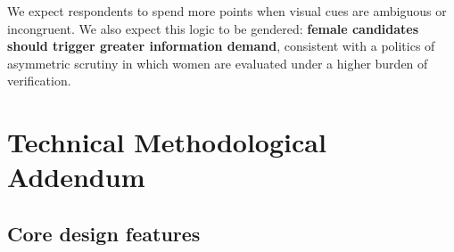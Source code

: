 \documentclass[11pt]{article}
\begin{document}
We expect respondents to spend more points when visual cues are ambiguous or incongruent. We also expect this logic to be gendered: {\bf female candidates should trigger greater information demand}, consistent with a politics of asymmetric scrutiny in which women are evaluated under a higher burden of verification.





\clearpage
\newpage
\section*{Technical Methodological Addendum}

\subsection*{Core design features}
\end{document}
